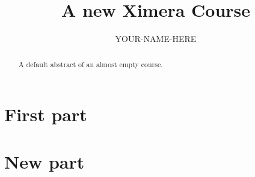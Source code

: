 \documentclass{xourse}
\title{A new Ximera Course}
\author{YOUR-NAME-HERE}
\begin{document}
\begin{abstract}
    A default abstract of an almost empty course.
\end{abstract}
\maketitle

\part{First part}


\part{New part}
\end{document}
